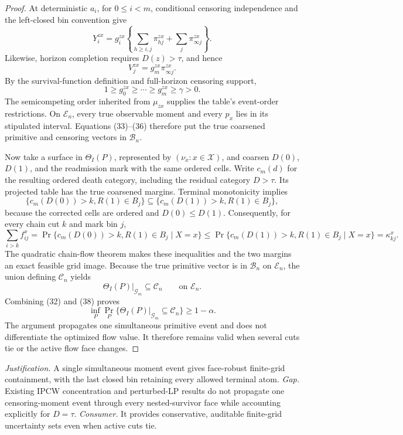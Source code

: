 \documentclass{article}
\begin{document}
\begin{proof}
At deterministic \(a_i\), for \(0\leq i<m\), conditional censoring independence and the left-closed bin convention give
\[
Y^{zx}_i=g^{zx}_i\left\{\sum_{h\geq i,j}\pi^{zx}_{hj}
 +\sum_j\pi^{zx}_{\infty j}\right\}.
\]
Likewise, horizon completion requires \(D(z)>\tau\), and hence
\[
V^{zx}_j=g^{zx}_m\pi^{zx}_{\infty j}.                               \tag{35}
\]
By the survival-function definition and full-horizon censoring support,
\[
1\geq g^{zx}_0\geq\cdots\geq g^{zx}_m\geq\gamma>0.                  \tag{36}
\]
The semicompeting order inherited from \(\mu_{zx}\) supplies the table's event-order restrictions.  On \(\mathscr E_n\), every true observable moment and every \(p_x\) lies in its stipulated interval.  Equations (33)--(36) therefore put the true coarsened primitive and censoring vectors in \(\mathcal B_n\).

Now take a surface in \(\Theta_I(P)\), represented by \((\nu_x:x\in\mathcal X)\), and coarsen \(D(0)\), \(D(1)\), and the readmission mark with the same ordered cells.  Write \(c_m(d)\) for the resulting ordered death category, including the residual category \(D>\tau\).  Its projected table has the true coarsened margins.  Terminal monotonicity implies
\[
\{c_m(D(0))>k,R(1)\in B_j\}
\subseteq
\{c_m(D(1))>k,R(1)\in B_j\},
\]
because the corrected cells are ordered and \(D(0)\leq D(1)\).  Consequently, for every chain cut \(k\) and mark bin \(j\),
\[
\sum_{i>k}f^x_{ij}
=\Pr\{c_m(D(0))>k,R(1)\in B_j\mid X=x\}
\leq\Pr\{c_m(D(1))>k,R(1)\in B_j\mid X=x\}
=\kappa^x_{kj}.                                                       \tag{37}
\]
The quadratic chain-flow theorem makes these inequalities and the two margins an exact feasible grid image.  Because the true primitive vector is in \(\mathcal B_n\) on \(\mathscr E_n\), the union defining \(\mathcal C_n\) yields
\[
\Theta_I(P)|_{\mathcal G_m}\subseteq\mathcal C_n
\qquad\text{on }\mathscr E_n.                                      \tag{38}
\]
Combining (32) and (38) proves
\[
\inf_P\Pr_P\{\Theta_I(P)|_{\mathcal G_m}\subseteq\mathcal C_n\}
\geq1-\alpha.
\]
The argument propagates one simultaneous primitive event and does not differentiate the optimized flow value.  It therefore remains valid when several cuts tie or the active flow face changes.
\end{proof}
\par\smallskip\noindent \textit{Justification.} A single simultaneous moment event gives face-robust finite-grid containment, with the last closed bin retaining every allowed terminal atom. \textit{Gap.} Existing IPCW concentration and perturbed-LP results do not propagate one censoring-moment event through every nested-survivor face while accounting explicitly for \(D=\tau\). \textit{Consumer.} It provides conservative, auditable finite-grid uncertainty sets even when active cuts tie.
\end{document}
